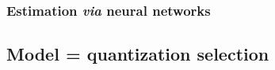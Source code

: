 \documentclass[english,xcolor={rgb,dvipsnames,table,usenames}]{beamer}
\newcommand\q{{\bm{q}}}
\begin{document}
\begin{frame}
\frametitle{Estimation \textit{via} neural networks}



%        
%    
%        
%    

\end{frame}



\newlength\figureheight
\newlength\figurewidth
\setlength\figureheight{8cm}
\setlength\figurewidth{11cm}
 
\begin{frame}
\frametitle{\secname}

\begin{figure}
\end{figure}

\end{frame}



\subsection{Model = quantization selection}
\end{document}
